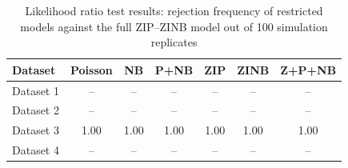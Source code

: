 \begin{table}[!h]
\caption{Likelihood ratio test results: rejection frequency of restricted models against the full ZIP--ZINB model out of 100 simulation replicates}
\centering
\begin{tabular}{lcccccc}
\toprule
Dataset & Poisson & NB & P+NB & ZIP & ZINB & Z+P+NB \\
\midrule
Dataset 1 & -- & -- & -- & -- & -- & -- \\
Dataset 2 & -- & -- & -- & -- & -- & -- \\
Dataset 3 & 1.00 & 1.00 & 1.00 & 1.00 & 1.00 & 1.00 \\
Dataset 4 & -- & -- & -- & -- & -- & -- \\
\bottomrule
\end{tabular}
\label{tab:sim_lrt}
\end{table}
